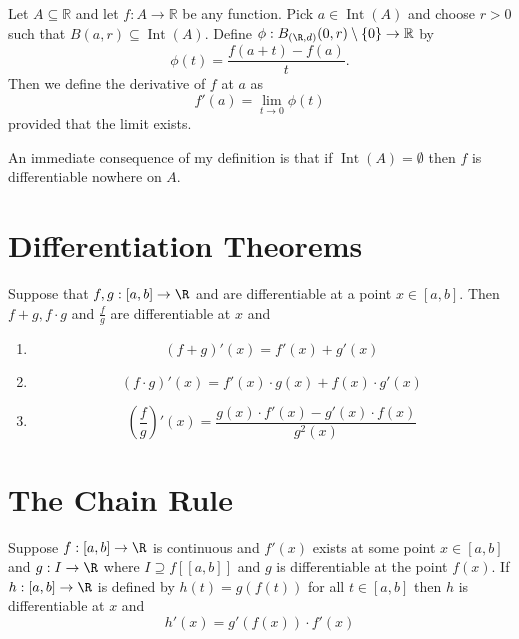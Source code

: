 	
	\begin{definition}
		Let $A \subseteq \mathbb{R}$ and let $f : A \to \mathbb{R}$ be any function. Pick $a \in \operatorname{Int}(A)$ and choose $r > 0$ such that $B(a, r) \subseteq \operatorname{Int}(A)$. Define $\phi : B_{(\R, d)}(0, r) \setminus \{0\} \to \mathbb{R}$ by $$\phi(t) = \frac{f(a+t) - f(a)}{t}.$$ Then we define the derivative of $f$ at $a$ as $$f'(a) = \lim_{t \to 0} \phi(t)$$ provided that the limit exists.
	\end{definition}
	
	\begin{point}
	An immediate consequence of my definition is that if $\operatorname{Int}(A) = \emptyset$ then $f$ is differentiable nowhere on $A$.
\end{point}




\section{Differentiation Theorems}
	
	\begin{theorem}
		Suppose that $f, g : [a, b] \to \R$ and are differentiable at a point $x \in [a, b]$. Then $f+g, f\cdot g$ and $\frac{f}{g}$ are differentiable at $x$ and 
		
		
		\begin{enumerate}[label=(\roman*)]
			\item $$(f+g)'(x) = f'(x) + g'(x)$$
			\item $$(f \cdot g)'(x) = f'(x)\cdot g(x) + f(x)\cdot g'(x)$$
			\item $$\left( \frac{f}{g}\right)'(x) = \frac{g(x)\cdot f'(x) - g'(x) \cdot f(x)}{g^2(x)}$$
		\end{enumerate}
	\end{theorem}
	
	
	\section{The Chain Rule}
	
	\begin{theorem}
		Suppose $f : [a, b] \to \R$ is continuous and $f'(x)$ exists at some point $x \in [a, b]$ and $g : I \to \R$ where $I \supseteq f\left[ [a, b]\right]$ and $g$ is differentiable at the point $f(x)$. If $h : [a, b] \to \R$ is defined by $h(t) = g(f(t))$ for all $t \in [a, b]$ then $h$ is differentiable at $x$ and $$h'(x) = g'\left( f(x)\right) \cdot f'(x)$$ 
	\end{theorem}
	
